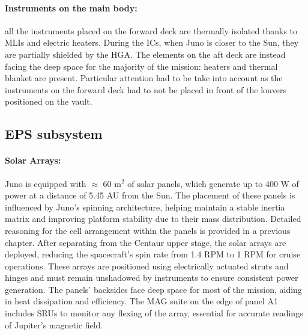 \paragraph{Instruments on the main body:} all the instruments placed on the forward deck are thermally isolated thanks to MLIs and electric heaters. During the ICs, when Juno is closer to the Sun, they are partially shielded by the HGA.\cite{JADE_info}\cite{JEDI_info} The elements on the aft deck are instead facing the deep space for the majority of the mission: heaters and thermal blanket are present.\cite{Waves_info} Particular attention had to be take into account as the instruments on the forward deck had to not be placed in front of the louvers positioned on the vault. 

\subsection{EPS subsystem}
\label{subsec:eps_sub}

\vspace{-2mm}

\paragraph{Solar Arrays:} Juno is equipped with $\approx$ 60 m$^2$ of solar panels, which generate up to 400 W of power at a distance of 5.45 AU from the Sun.\cite{pannelli} The placement of these panels is influenced by Juno's spinning architecture, helping maintain a stable inertia matrix and improving platform stability due to their mass distribution.\cite{solar_panels_coef} Detailed reasoning for the cell arrangement within the panels is provided in a previous chapter. After separating from the Centaur upper stage, the solar arrays are deployed, reducing the spacecraft's spin rate from 1.4 RPM to 1 RPM for cruise operations.\cite{Juno_launch} These arrays are positioned using electrically actuated struts and hinges and must remain unshadowed by instruments to ensure consistent power generation. The panels' backsides face deep space for most of the mission, aiding in heat dissipation and efficiency. The MAG suite on the edge of panel A1 includes SRUs to monitor any flexing of the array, essential for accurate readings of Jupiter's magnetic field. 

\vspace{-4mm}

